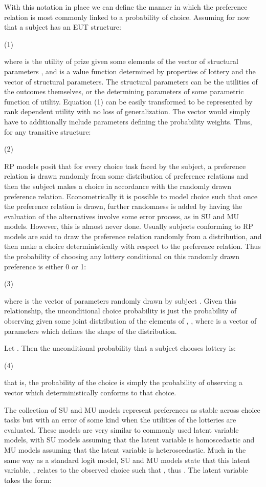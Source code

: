 With this notation in place we can define the manner in which the preference relation  is most commonly linked to a probability of choice.
Assuming for now that a subject has an EUT structure: 

		(1)

where  is the utility of prize  given some elements of the vector of structural parameters , and   is a value function determined by properties of lottery  and the vector of structural parameters.
The structural parameters  can be the utilities of the outcomes themselves, or the determining parameters of some parametric function of utility.
Equation (1) can be easily transformed to be represented by rank dependent utility with no loss of generalization.
The  vector would simply have to additionally include parameters defining the probability weights.
Thus, for any transitive structure:

		(2)

RP models posit that for every choice task faced by the subject, a preference relation is drawn randomly from some distribution of preference relations and then the subject makes a choice in accordance with the randomly drawn preference relation.
Econometrically it is possible to model choice such that once the preference relation is drawn, further randomness is added by having the evaluation of the alternatives involve some error process, as in SU and MU models.
However, this is almost never done.
Usually subjects conforming to RP models are said to draw the preference relation randomly from a distribution, and then make a choice deterministically with respect to the preference relation.
Thus the probability of choosing any lottery conditional on this randomly drawn preference is either 0 or 1:

		(3)

where  is the vector of parameters randomly drawn by subject .
Given this relationship, the unconditional choice probability is just the probability of observing  given some joint distribution of the elements of , , where  is a vector of parameters which defines the shape of the distribution.


Let .
Then the unconditional probability that a subject chooses lottery  is:

		(4)

that is, the probability of the choice is simply the probability of observing a  vector which deterministically conforms to that choice.


The collection of SU and MU models represent preferences as stable across choice tasks but with an error of some kind when the utilities of the lotteries are evaluated.
These models are very similar to commonly used latent variable models, with SU models assuming that the latent variable is homoscedastic and MU models assuming that the latent variable is heteroscedastic.
Much in the same way as a standard logit model, SU and MU models state that this latent variable, , relates to the observed choice such that , thus .
The latent variable takes the form:

